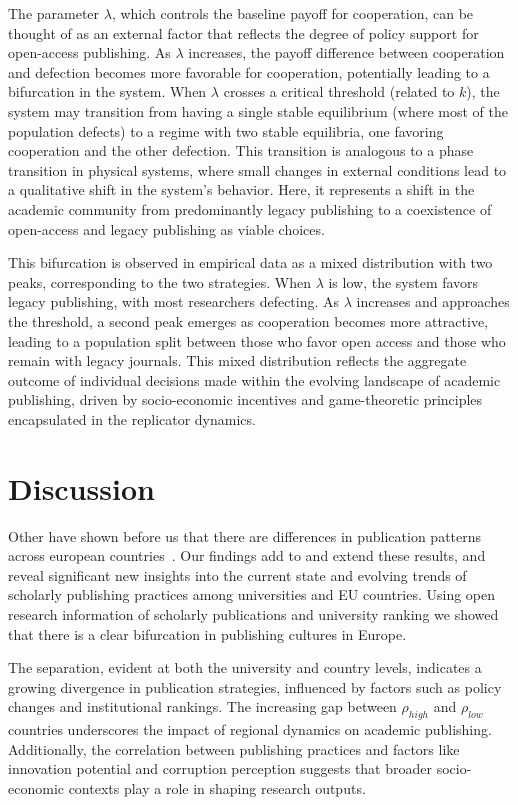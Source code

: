 \documentclass[amsfonts, amssymb, prl, superscriptaddress, notitlepage, twocolumn, nofootinbib]{revtex4-2}
\begin{document}
The parameter $\lambda$, which controls the baseline payoff for cooperation, can be thought of as an external factor that reflects the degree of policy support for open-access publishing. As $\lambda$ increases, the payoff difference between cooperation and defection becomes more favorable for cooperation, potentially leading to a bifurcation in the system. When $\lambda$ crosses a critical threshold (related to $k$), the system may transition from having a single stable equilibrium (where most of the population defects) to a regime with two stable equilibria, one favoring cooperation and the other defection. This transition is analogous to a phase transition in physical systems, where small changes in external conditions lead to a qualitative shift in the system's behavior. Here, it represents a shift in the academic community from predominantly legacy publishing to a coexistence of open-access and legacy publishing as viable choices.

This bifurcation is observed in empirical data as a mixed distribution with two peaks, corresponding to the two strategies. When $\lambda$ is low, the system favors legacy publishing, with most researchers defecting. As $\lambda$ increases and approaches the threshold, a second peak emerges as cooperation becomes more attractive, leading to a population split between those who favor open access and those who remain with legacy journals. This mixed distribution reflects the aggregate outcome of individual decisions made within the evolving landscape of academic publishing, driven by socio-economic incentives and game-theoretic principles encapsulated in the replicator dynamics.



\section{Discussion}
Other have shown before us that there are differences in publication patterns across european countries~\cite{kulczycki_publication_2018,sasvari2023current,csomos_understanding_2023}. 
Our findings add to and extend these results, and reveal significant new insights into the current state and evolving trends of scholarly publishing practices among universities and EU countries. Using open research information of scholarly publications and university ranking we showed that there is a clear bifurcation in publishing cultures in Europe. 

The separation, evident at both the university and country levels, indicates a growing divergence in publication strategies, influenced by factors such as policy changes and institutional rankings. The increasing gap between $\rho_{high}$ and $\rho_{low}$ countries underscores the impact of regional dynamics on academic publishing. Additionally, the correlation between publishing practices and factors like innovation potential and corruption perception suggests that broader socio-economic contexts play a role in shaping research outputs. 
\end{document}
